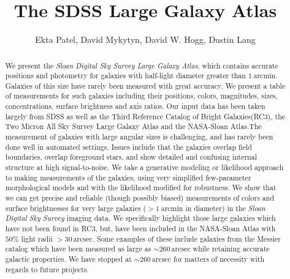 \documentclass[12pt,preprint,pdftex]{aastex}
\newcounter{address}
\newcommand{\project}[1]{\textsl{#1}}
\newcommand{\units}[1]{\mathrm{#1}}
\renewcommand{\arcmin}{\units{arcmin}}
\renewcommand{\arcsec}{\units{arcsec}}
\begin{document}
\title{
       The SDSS Large Galaxy Atlas
      }
\author{
        Ekta Patel\altaffilmark{\ref{CCPP}},
        David Mykytyn\altaffilmark{\ref{CCPP}},
        David W. Hogg\altaffilmark{\ref{CCPP},\ref{MPIA},\ref{email}},
        Dustin Lang\altaffilmark{\ref{CMU}}
       }
\setcounter{address}{1}

\begin{abstract}
We present the \project{Sloan Digital Sky Survey Large Galaxy Atlas}, which contains
accurate positions and photometry for galaxies with half-light diameter
greater than $1~\arcmin$. Galaxies of this size have rarely been measured with great accuracy. We present a table of measurements for such galaxies including their positions, colors, magnitudes, sizes, concentrations, surface brightness and axis ratios. Our input data has been taken largely from SDSS as well as the Third Reference Catalog of Bright Galaxies(RC3), the Two Micron All Sky Survey Large Galaxy Atlas and the NASA-Sloan Atlas.The measurement of galaxies with large angular sizes is challenging,
and has rarely been done well in automated settings.  Issues include
that the galaxies overlap field boundaries, overlap foreground stars,
and show detailed and confusing internal structure at high
signal-to-noise.  We take a generative modeling or likelihood approach
to making measurements of the galaxies, using very simplified
few-parameter morphological models and with the likelihood modified
for robustness.  We show that we can get precise and reliable (though
possibly biased) measurements of colors and surface brightnesses for
very large galaxies ($>1~\arcmin$ in diameter) in the \project{Sloan
  Digital Sky Survey} imaging data. We specifically highlight those large galaxies which have not been found in RC3, but, have been included in the NASA-Sloan Atlas with $50\%$ light radii $> 30\,\arcsec$. Some examples of these include galaxies from the Messier catalog which have been measured as large as $\sim 260\,\arcsec$ while retaining accurate galactic properties. We have stopped at $\sim 260\,\arcsec$ for matters of necessity with regards to future projects.

\end{abstract}
\end{document}
